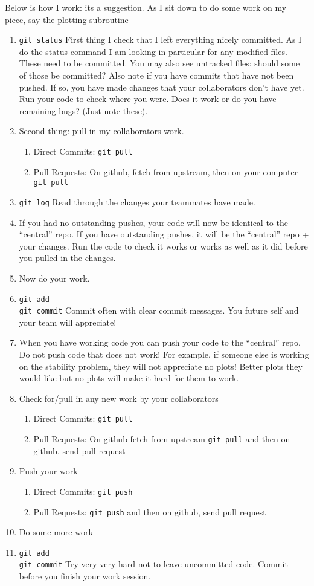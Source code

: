 \documentclass[11pt]{article}
\begin{document}
Below is how I work: its a suggestion. As I sit down to do some work on my piece, say the plotting subroutine
\begin{enumerate}
\item \texttt{git status}  First thing I check that I left everything nicely committed.  As I do the status command I am looking in particular for any modified files. These need to be committed.  You may also see untracked files: should some of those be committed?  Also note if you have commits that have not been pushed.  If so, you have made changes that your collaborators don't have yet.  Run your code to check where you were.  Does it work or do you have remaining bugs?  (Just note these).
\item Second thing: pull in my collaborators work.
\begin{enumerate}
\item Direct Commits: \texttt{git pull}
\item Pull Requests: On github, fetch from upstream, then on your computer \texttt{git pull}
\end{enumerate}
\item \texttt{git log} Read through the changes your teammates have made.
\item If you had no outstanding pushes, your code will now be identical to the ``central'' repo. If you have outstanding pushes, it will be the ``central'' repo + your changes. Run the code to check it works or works as well as it did before you pulled in the changes.
\item Now do your work.
\item \texttt{git add} \\ \texttt{git commit} Commit often with clear commit messages.  You future self and your team will appreciate!
\item When you have working code you can push your code to the
  ``central'' repo.  Do not push code that does not work!  For
  example, if someone else is working on the stability problem, they
  will not appreciate no plots!  Better plots they would like but no
  plots will make it hard for them to work.
\item Check for/pull in any new work by your collaborators
\begin{enumerate}
\item Direct Commits: \texttt{git pull}
\item Pull Requests: On github fetch from upstream \texttt{git pull}  and then on github, send pull request
\end{enumerate}
\item Push your work
\begin{enumerate}
\item Direct Commits: \texttt{git push}
\item Pull Requests: \texttt{git push}  and then on github, send pull request
\end{enumerate}
\item Do some more work
\item \texttt{git add} \\ \texttt{git commit}  Try very very hard not to leave uncommitted code.  Commit before you finish your work session.
\end{enumerate}
\end{document}
